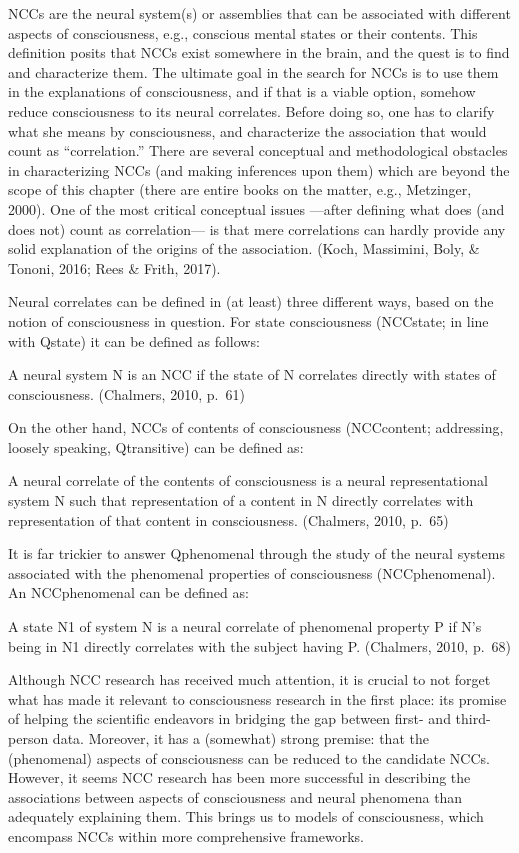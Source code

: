 \documentclass[12pt,twoside]{reedthesis}
\begin{document}
NCCs are the neural system(s) or assemblies that can be associated with different aspects of consciousness, e.g., conscious mental states or their contents. This definition posits that NCCs exist somewhere in the brain, and the quest is to find and characterize them. The ultimate goal in the search for NCCs is to use them in the explanations of consciousness, and if that is a viable option, somehow reduce consciousness to its neural correlates. Before doing so, one has to clarify what she means by consciousness, and characterize the association that would count as ``correlation.'' There are several conceptual and methodological obstacles in characterizing NCCs (and making inferences upon them) which are beyond the scope of this chapter (there are entire books on the matter, e.g., Metzinger, 2000). One of the most critical conceptual issues ---after defining what does (and does not) count as correlation--- is that mere correlations can hardly provide any solid explanation of the origins of the association. (Koch, Massimini, Boly, \& Tononi, 2016; Rees \& Frith, 2017).

Neural correlates can be defined in (at least) three different ways, based on the notion of consciousness in question. For state consciousness (NCCstate; in line with Qstate) it can be defined as follows:

A neural system N is an NCC if the state of N correlates directly with states of consciousness. (Chalmers, 2010, p.~61)

On the other hand, NCCs of contents of consciousness (NCCcontent; addressing, loosely speaking, Qtransitive) can be defined as:

A neural correlate of the contents of consciousness is a neural representational system N such that representation of a content in N directly correlates with representation of that content in consciousness. (Chalmers, 2010, p.~65)

It is far trickier to answer Qphenomenal through the study of the neural systems associated with the phenomenal properties of consciousness (NCCphenomenal). An NCCphenomenal can be defined as:

A state N1 of system N is a neural correlate of phenomenal property P if N's being in N1 directly correlates with the subject having P. (Chalmers, 2010, p.~68)

Although NCC research has received much attention, it is crucial to not forget what has made it relevant to consciousness research in the first place: its promise of helping the scientific endeavors in bridging the gap between first- and third-person data. Moreover, it has a (somewhat) strong premise: that the (phenomenal) aspects of consciousness can be reduced to the candidate NCCs. However, it seems NCC research has been more successful in describing the associations between aspects of consciousness and neural phenomena than adequately explaining them. This brings us to models of consciousness, which encompass NCCs within more comprehensive frameworks.
\end{document}
